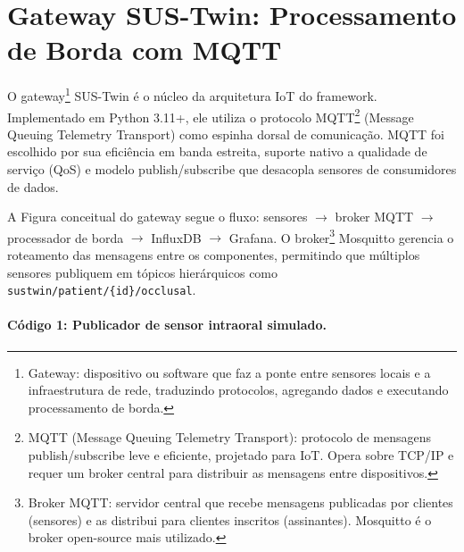 \section{Gateway SUS-Twin: Processamento de Borda com MQTT}

O gateway\footnote{Gateway: dispositivo ou software que faz a ponte entre sensores locais e a infraestrutura de rede, traduzindo protocolos, agregando dados e executando processamento de borda.} SUS-Twin é o núcleo da arquitetura IoT do framework. Implementado em Python 3.11+, ele utiliza o protocolo MQTT\footnote{MQTT (Message Queuing Telemetry Transport): protocolo de mensagens publish/subscribe leve e eficiente, projetado para IoT. Opera sobre TCP/IP e requer um broker central para distribuir as mensagens entre dispositivos.} (Message Queuing Telemetry Transport) como espinha dorsal de comunicação. MQTT foi escolhido por sua eficiência em banda estreita, suporte nativo a qualidade de serviço (QoS) e modelo publish/subscribe que desacopla sensores de consumidores de dados.

A Figura conceitual do gateway segue o fluxo: sensores $\rightarrow$ broker MQTT $\rightarrow$ processador de borda $\rightarrow$ InfluxDB $\rightarrow$ Grafana. O broker\footnote{Broker MQTT: servidor central que recebe mensagens publicadas por clientes (sensores) e as distribui para clientes inscritos (assinantes). Mosquitto é o broker open-source mais utilizado.} Mosquitto gerencia o roteamento das mensagens entre os componentes, permitindo que múltiplos sensores publiquem em tópicos hierárquicos como \texttt{sustwin/patient/\{id\}/occlusal}.

\paragraph{Código 1: Publicador de sensor intraoral simulado.}

